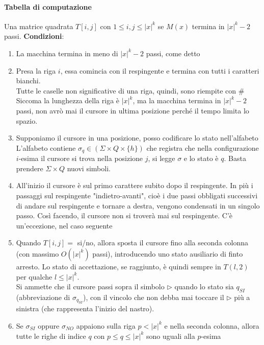 \documentclass[10pt]{book}
\begin{document}
\paragraph{Tabella di computazione} Una matrice quadrata $T[i, j]$ con $1 \leq i,j \leq |x|^k$ se $M(x)$ termina in $|x|^k - 2$ passi. \textbf{Condizioni}:
\begin{enumerate}
	\item La macchina termina in meno di $|x|^k - 2$ passi, come detto
	\item Presa la riga $i$, essa comincia con il respingente e termina con tutti i caratteri bianchi.\\
	Tutte le caselle non significative di una riga, quindi, sono riempite con $\#$\\
	Siccoma la lunghezza della riga è $|x|^k$, ma la macchina termina in $|x|^k - 2$ passi, non avrò mai il cursore in ultima posizione perché il tempo limita lo spazio.
	\item Supponiamo il cursore in una posizione, posso codificare lo stato nell'alfabeto\\
	L'alfabeto contiene $\sigma_q \in (\Sigma \times Q \times \{h\})$ che registra che nella configurazione $i$-esima il cursore si trova nella posizione $j$, si legge $\sigma$ e lo stato è $q$. Basta prendere $\Sigma \times Q$ nuovi simboli.
	\item All'inizio il cursore è sul primo carattere subito dopo il respingente. In più i passaggi sul respingente "indietro-avanti", cioè i due passi obbligati successivi di andare sul respingente e tornare a destra, vengono condensati in un singolo passo. Così facendo, il cursore non si troverà mai sul respingente. C'è un'eccezione, nel caso seguente
	\item Quando $T[i, j] =$ si/no, allora sposta il cursore fino alla seconda colonna (con massimo $O(|x|^k)$ passi), introducendo uno stato ausiliario di finto arresto. Lo stato di accettazione, se raggiunto, è quindi sempre in $T(l, 2)$ per qualche $l \leq |x|^k$.\\
	Si ammette che il cursore passi sopra il simbolo $\triangleright$ quando lo stato sia $q_{SI}$ (abbreviazione di $\sigma_{q_{SI}}$), con il vincolo che non debba mai toccare il $\triangleright$ più a sinistra (che rappresenta l'inizio del nastro).
	\item Se $\sigma_{SI}$ oppure $\sigma_{NO}$ appaiono sulla riga $p<|x|^k$ e nella seconda colonna, allora tutte le righe di indice $q$ con $p\leq q \leq |x|^k$ sono uguali alla $p$-esima
\end{enumerate}
\end{document}

